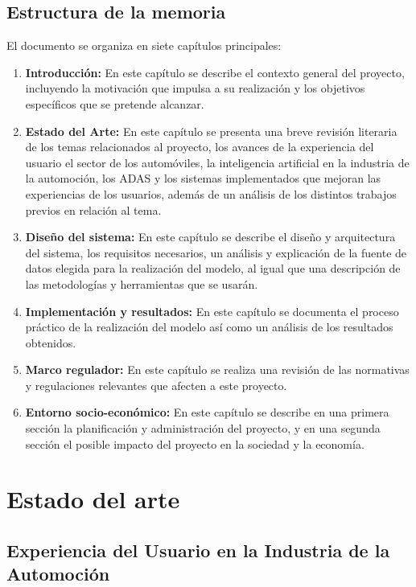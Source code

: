 \documentclass[12pt]{report} %
\begin{document}
\section{Estructura de la memoria}

El documento se organiza en siete capítulos principales:

\begin{enumerate}

    \item \textbf{Introducción:} En este capítulo se describe el contexto general del proyecto, incluyendo la motivación que impulsa a su realización y los objetivos específicos que se pretende alcanzar.
    \item \textbf{Estado del Arte:} En este capítulo se presenta una breve revisión literaria de los temas relacionados al proyecto, los avances de la experiencia del usuario el sector de los automóviles, la inteligencia artificial en la industria de la automoción, los ADAS y los sistemas implementados que mejoran las experiencias de los usuarios, además de un análisis de los  distintos trabajos previos en relación al tema. 
    \item \textbf{Diseño del sistema:} En este capítulo se describe el diseño y arquitectura del sistema, los requisitos necesarios, un análisis y explicación de la fuente de datos elegida para la realización del modelo, al igual que una descripción de las metodologías y herramientas que se usarán. 
    \item \textbf{Implementación y resultados:} En este capítulo se documenta el proceso práctico de la realización del modelo así como un análisis de los resultados obtenidos.
    \item \textbf{Marco regulador:} En este capítulo se realiza una revisión de las normativas y regulaciones relevantes que afecten a este proyecto. 
    \item \textbf{Entorno socio-económico:} En este capítulo se describe en una primera sección la planificación y administración del proyecto, y en una segunda sección el posible impacto del proyecto en la sociedad y la economía.

\end{enumerate}



\chapter{Estado del arte}

\section{Experiencia del Usuario en la Industria de la Automoción}
\end{document}
